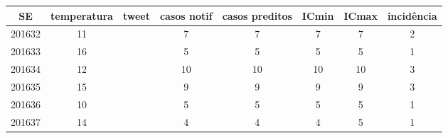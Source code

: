 \begin{tabular}{c|ccccccc}
  \hline
SE & temperatura & tweet & casos notif & casos preditos & ICmin & ICmax & incidência \\ 
  \hline
201632 & 11 &  & 7 & 7 & 7 & 7 & 2 \\ 
  201633 & 16 &  & 5 & 5 & 5 & 5 & 1 \\ 
  201634 & 12 &  & 10 & 10 & 10 & 10 & 3 \\ 
  201635 & 15 &  & 9 & 9 & 9 & 9 & 3 \\ 
  201636 & 10 &  & 5 & 5 & 5 & 5 & 1 \\ 
  201637 & 14 &  & 4 & 4 & 4 & 5 & 1 \\ 
   \hline
\end{tabular}
